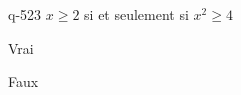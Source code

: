 \begin{truefalse}{q-523}
$x \geq 2$ si et seulement si $x^2\geq 4$
\item Vrai
\item* Faux
\end{truefalse}

